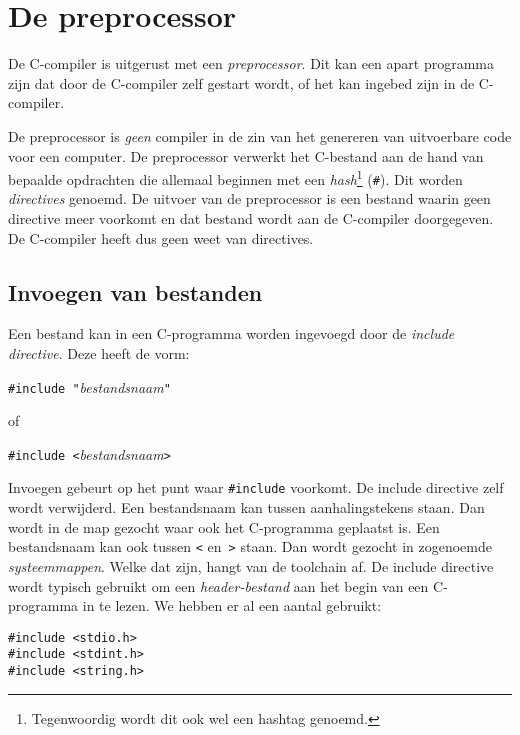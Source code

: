 \chapter{De preprocessor}
\label{cha:preprocessor}
\thispagestyle{empty}

De C-compiler is uitgerust met een \textsl{preprocessor}. Dit kan een apart programma zijn dat door de C-compiler zelf gestart wordt, of het kan ingebed zijn in de C-compiler.

De preprocessor is \textsl{geen} compiler in de zin van het genereren van uitvoerbare code voor een computer. De preprocessor verwerkt het C-bestand aan de hand van bepaalde opdrachten die allemaal beginnen met een \textsl{hash}\footnote{Tegenwoordig wordt dit ook wel een hashtag genoemd.} (\texttt{\#}). Dit worden \textsl{directives} genoemd. De uitvoer van de preprocessor is een bestand waarin geen directive meer voorkomt en dat bestand wordt aan de C-compiler doorgegeven. De C-compiler heeft dus geen weet van directives.

\section{Invoegen van bestanden}
Een bestand kan in een C-programma worden ingevoegd door de \textsl{include directive}. Deze heeft de vorm:

\hspace*{1em}\texttt{\#include "{}}\textsl{bestandsnaam}\texttt{"}

of

\hspace*{1em}\texttt{\#include <}\textsl{bestandsnaam}\texttt{>}

Invoegen gebeurt op het punt waar \texttt{\#include} voorkomt. De include directive zelf wordt verwijderd. Een bestandsnaam kan tussen aanhalingstekens staan. Dan wordt in de map gezocht waar ook het C-programma geplaatst is. Een bestandsnaam kan ook tussen \texttt{<} en~\texttt{>} staan. Dan wordt gezocht in zogenoemde \textsl{systeemmappen}. Welke dat zijn, hangt van de toolchain af. De include directive wordt typisch gebruikt om een \textsl{header-bestand} aan het begin van een C-programma in te lezen. We hebben er al een aantal gebruikt:

\hspace*{1em}\texttt{\#include <stdio.h>}\\
\hspace*{1em}\texttt{\#include <stdint.h>}\\
\hspace*{1em}\texttt{\#include <string.h>}\\

